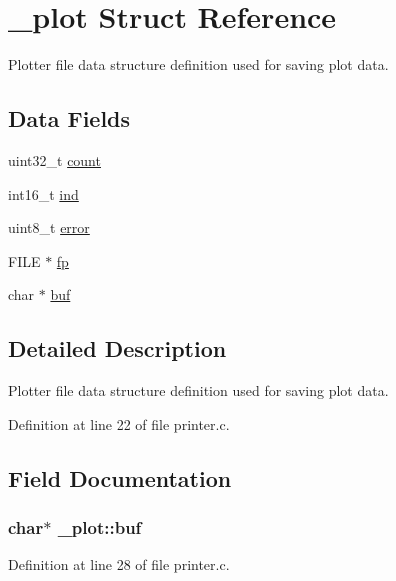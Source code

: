 \hypertarget{struct__plot}{\section{\-\_\-plot Struct Reference}
\label{struct__plot}
}


Plotter file data structure definition used for saving plot data.  


\subsection*{Data Fields}
\begin{DoxyCompactItemize}
\item 
uint32\-\_\-t \hyperlink{struct__plot_af4d84e2aa52eabdc7ccc2fbf18272e98}{count}
\item 
int16\-\_\-t \hyperlink{struct__plot_ab02a041a2c701b09447d883089abba4f}{ind}
\item 
uint8\-\_\-t \hyperlink{struct__plot_a9a9516230fefbc6cdd6e4ca5d6403509}{error}
\item 
F\-I\-L\-E $\ast$ \hyperlink{struct__plot_aec1bc5aae9d9c56584ee0cbb31515ac6}{fp}
\item 
char $\ast$ \hyperlink{struct__plot_ad7907cd2e279a361e68160bae8106ae4}{buf}
\end{DoxyCompactItemize}


\subsection{Detailed Description}
Plotter file data structure definition used for saving plot data. 

Definition at line 22 of file printer.\-c.



\subsection{Field Documentation}
\hypertarget{struct__plot_ad7907cd2e279a361e68160bae8106ae4}{
\subsubsection[{buf}]{\setlength{\rightskip}{0pt plus 5cm}char$\ast$ \-\_\-plot\-::buf}}\label{struct__plot_ad7907cd2e279a361e68160bae8106ae4}


Definition at line 28 of file printer.\-c.



